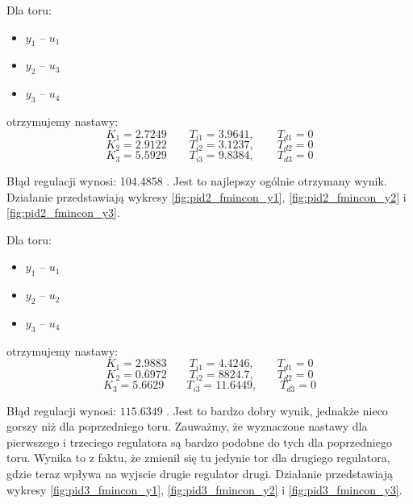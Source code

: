 Dla toru:
\begin{itemize}
  \item $y_1$ -- $u_1$
 \item $y_2$ -- $u_3$
 \item $y_3$ -- $u_4$
\end{itemize}

otrzymujemy nastawy:
\begin{equation}
  K_1 = \num{2,7249} \qquad T_{i1} = \num{3,9641}, \qquad T_{d1} = 0 \nonumber
\end{equation}
\begin{equation}
  K_2 = \num{2,9122} \qquad T_{i2} = \num{3,1237}, \qquad T_{d2} = 0
\end{equation}
\begin{equation}
  K_3 = \num{5,5929} \qquad T_{i3} = \num{9,8384}, \qquad T_{d3} = 0 \nonumber
\end{equation}

Błąd regulacji wynosi: \num{104,4858} . Jest to najlepszy ogólnie otrzymany wynik.
Działanie
przedstawiają wykresy \ref{fig:pid2_fmincon_y1}, \ref{fig:pid2_fmincon_y2} i \ref{fig:pid2_fmincon_y3}.

Dla toru:
\begin{itemize}
  \item $y_1$ -- $u_1$
 \item $y_2$ -- $u_2$
 \item $y_3$ -- $u_4$
\end{itemize}

otrzymujemy nastawy:
\begin{equation}
  K_1 = \num{2,9883} \qquad T_{i1} = \num{4,4246}, \qquad T_{d1} = 0 \nonumber
\end{equation}
\begin{equation}
  K_2 = \num{0,6972} \qquad T_{i2} = \num{8824,7}, \qquad T_{d2} = 0
\end{equation}
\begin{equation}
  K_3 = \num{5,6629} \qquad T_{i3} = \num{11,6449}, \qquad T_{d3} = 0 \nonumber
\end{equation}

Błąd regulacji wynosi: $\num{115,6349}$ .
Jest to bardzo dobry wynik, jednakże nieco gorszy niż dla poprzedniego toru.
Zauważmy, że wyznaczone nastawy dla pierwszego i trzeciego regulatora są bardzo podobne do tych dla poprzedniego toru.
Wynika to z faktu, że zmienił się tu jedynie tor dla drugiego regulatora, gdzie teraz wpływa na wyjscie drugie regulator drugi.
Działanie
przedstawiają wykresy \ref{fig:pid3_fmincon_y1}, \ref{fig:pid3_fmincon_y2} i \ref{fig:pid3_fmincon_y3}.

